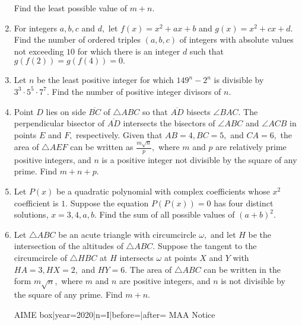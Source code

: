 \documentclass{article}
\begin{document}
\begin{enumerate}[label=\arabic*., itemsep=0.5em]
Find the least possible value of \(m+n.\)\par \vspace{0.5em}\item For integers \(a,b,c\) and \(d,\) let \(f(x)=x^2+ax+b\) and \(g(x)=x^2+cx+d.\) Find the number of ordered triples \((a,b,c)\) of integers with absolute values not exceeding \(10\) for which there is an integer \(d\) such that \(g(f(2))=g(f(4))=0.\)\par \vspace{0.5em}\item Let \(n\) be the least positive integer for which \(149^n-2^n\) is divisible by \(3^3\cdot5^5\cdot7^7.\) Find the number of positive integer divisors of \(n.\)\par \vspace{0.5em}\item Point \(D\) lies on side \(\overline{BC}\) of \(\triangle ABC\) so that \(\overline{AD}\) bisects \(\angle BAC.\) The perpendicular bisector of \(\overline{AD}\) intersects the bisectors of \(\angle ABC\) and \(\angle ACB\) in points \(E\) and \(F,\) respectively. Given that \(AB=4,BC=5,\) and \(CA=6,\) the area of \(\triangle AEF\) can be written as \(\tfrac{m\sqrt{n}}p,\) where \(m\) and \(p\) are relatively prime positive integers, and \(n\) is a positive integer not divisible by the square of any prime. Find \(m+n+p\).\par \vspace{0.5em}\item Let \(P(x)\) be a quadratic polynomial with complex coefficients whose \(x^2\) coefficient is \(1.\) Suppose the equation \(P(P(x))=0\) has four distinct solutions, \(x=3,4,a,b.\) Find the sum of all possible values of \((a+b)^2.\)\par \vspace{0.5em}\item Let \(\triangle ABC\) be an acute triangle with circumcircle \(\omega,\) and let \(H\) be the intersection of the altitudes of \(\triangle ABC.\) Suppose the tangent to the circumcircle of \(\triangle HBC\) at \(H\) intersects \(\omega\) at points \(X\) and \(Y\) with \(HA=3,HX=2,\) and \(HY=6.\) The area of \(\triangle ABC\) can be written in the form \(m\sqrt{n},\) where \(m\) and \(n\) are positive integers, and \(n\) is not divisible by the square of any prime. Find \(m+n.\)




{{AIME box|year=2020|n=I|before=|after=}}
{{MAA Notice}}\par \vspace{0.5em}\end{enumerate}
\end{document}
